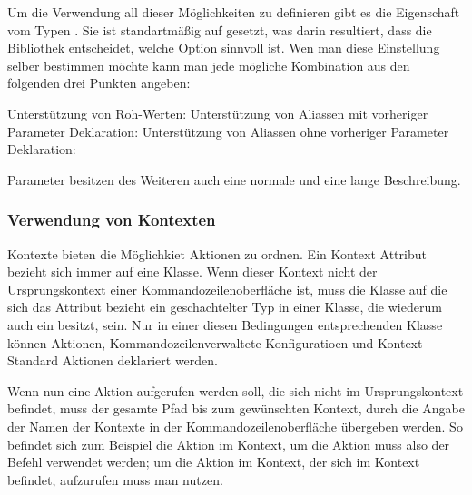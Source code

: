 Um die Verwendung all dieser Möglichkeiten zu definieren gibt es die  Eigenschaft vom Typen .
Sie ist standartmä\ss ig auf  gesetzt, was darin resultiert, dass die Bibliothek entscheidet, welche Option sinnvoll ist.
Wen man diese Einstellung selber bestimmen möchte kann man jede mögliche Kombination aus den folgenden drei Punkten angeben:
\begin{outline}
 \1 Unterstützung von Roh-Werten: 
 \1 Unterstützung von Aliassen mit vorheriger Parameter Deklaration: 
 \1 Unterstützung von Aliassen ohne vorheriger Parameter Deklaration: 
\end{outline}

Parameter besitzen des Weiteren auch eine normale und eine lange Beschreibung.
\subsubsection{Verwendung von Kontexten}
Kontexte bieten die Möglichkiet Aktionen zu ordnen.
Ein Kontext Attribut bezieht sich immer auf eine Klasse.
Wenn dieser Kontext nicht der Ursprungskontext einer Kommandozeilenoberfläche ist, 
muss die Klasse auf die sich das Attribut bezieht ein geschachtelter Typ in einer Klasse, die wiederum  auch ein  besitzt, sein.
Nur in einer diesen Bedingungen entsprechenden Klasse können Aktionen, Kommandozeilenverwaltete Konfiguratioen und Kontext Standard Aktionen deklariert werden.

Wenn nun eine Aktion aufgerufen werden soll, die sich nicht im Ursprungskontext befindet,
muss der gesamte Pfad bis zum gewünschten Kontext, durch die Angabe der Namen der Kontexte in der Kommandozeilenoberfläche übergeben werden.
So befindet sich zum Beispiel die  Aktion im  Kontext,
um die Aktion muss also der Befehl  verwendet werden;
um die  Aktion im  Kontext, der sich im  Kontext befindet,
aufzurufen muss man  nutzen.

